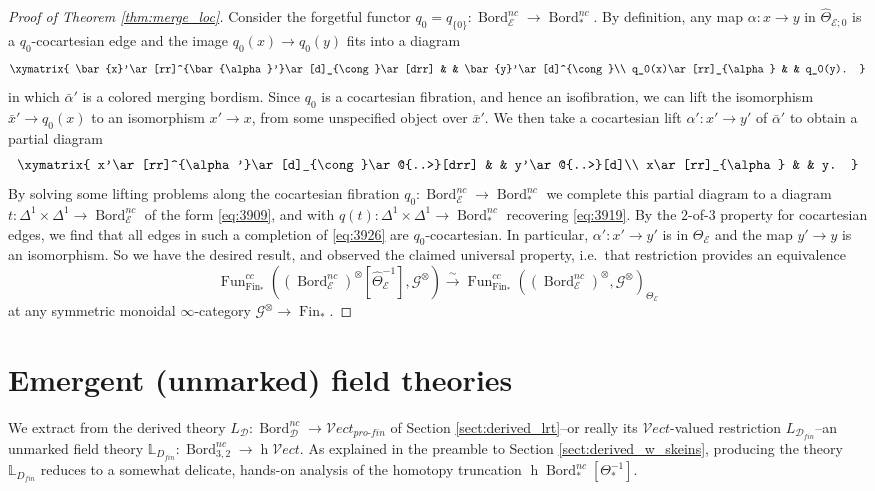\documentclass[reqno]{amsart}
\theoremstyle{definition}
\newcommand{\mbb}[1]{\mathbb{#1}}
\newcommand{\msc}[1]{\mathscr{#1}}
\newcommand{\opn}[1]{\operatorname{#1}}
\newcommand{\ot}{\otimes}
\newcommand{\Vect}{\msc{V}\!ect}
\newcommand{\pf}{pro\text{-}fin}
\DeclareMathOperator{\Fun}{Fun}
\DeclareMathOperator{\Fin}{Fin}
\DeclareMathOperator{\Bord}{Bord}
\renewcommand{\1}{\mathbf{1}}
\renewcommand{\hat}{\widehat}
\begin{document}
\begin{proof}[Proof of Theorem \ref{thm:merge_loc}]
Consider the forgetful functor $q_0=q_{\{0\}}:\Bord_{\msc{E}}^{nc}\to \Bord_{\ast}^{nc}$.  By definition, any map $\alpha:x\to y$ in $\hat{\Theta}_{\msc{E};0}$ is a $q_0$-cocartesian edge and the image $q_0(x)\to q_0(y)$ fits into a diagram
\begin{equation}\label{eq:3919}
\xymatrix{
\bar{x}'\ar[rr]^{\bar{\alpha}'}\ar[d]_{\cong}\ar[drr] & & \bar{y}'\ar[d]^{\cong}\\
q_0(x)\ar[rr]_{\alpha} & & q_0(y).
}
\end{equation}
in which $\bar{\alpha}'$ is a colored merging bordism.  Since $q_0$ is a cocartesian fibration, and hence an isofibration, we can lift the isomorphism $\bar{x}'\to q_0(x)$ to an isomorphism $x'\to x$, from some unspecified object over $\bar{x}'$.  We then take a cocartesian lift $\alpha':x'\to y'$ of $\bar{\alpha}'$ to obtain a partial diagram
\begin{equation}\label{eq:3926}
\xymatrix{
x'\ar[rr]^{\alpha'}\ar[d]_{\cong}\ar@{..>}[drr] & & y'\ar@{..>}[d]\\
x\ar[rr]_{\alpha} & & y.
}
\end{equation}
By solving some lifting problems along the cocartesian fibration $q_0:\Bord_{\msc{E}}^{nc}\to \Bord_{\ast}^{nc}$ we complete this partial diagram to a diagram $t:\Delta^1\times\Delta^1\to \Bord_{\msc{E}}^{nc}$ of the form \eqref{eq:3909}, and with $q(t):\Delta^1\times\Delta^1\to \Bord_{\ast}^{nc}$ recovering \eqref{eq:3919}.  By the $2$-of-$3$ property for cocartesian edges, we find that all edges in such a completion of \eqref{eq:3926} are $q_0$-cocartesian.  In particular, $\alpha':x'\to y'$ is in $\Theta_{\msc{E}}$ and the map $y'\to y$ is an isomorphism.  So we have the desired result, and observed the claimed universal property, i.e.\ that restriction provides an equivalence
\[
\Fun_{\Fin_{\ast}}^{cc}\left((\Bord_{\msc{E}}^{nc})^{\ot}[\hat{\Theta}_{\msc{E}}^{-1}],\msc{G}^{\ot}\right)\overset{\sim}\to \Fun_{\Fin_{\ast}}^{cc}\left((\Bord_{\msc{E}}^{nc})^{\ot},\msc{G}^{\ot}\right)_{\Theta_{\msc{E}}}
\]
at any symmetric monoidal $\infty$-category $\msc{G}^{\ot}\to \Fin_{\ast}$.
\end{proof}


\section{Emergent (unmarked) field theories}
\label{sect:unmarked_lrt}

We extract from the derived theory $L_{\msc{D}}:\Bord_{\msc{D}}^{nc}\to \Vect_{\pf}$ of Section \ref{sect:derived_lrt}--or really its $\Vect$-valued restriction $L_{\msc{D}_{fin}}$--an unmarked field theory $\mbb{L}_{D_{fin}}:\Bord_{3,2}^{nc}\to \opn{h}\Vect$. As explained in the preamble to Section \ref{sect:derived_w_skeins}, producing the theory $\mbb{L}_{D_{fin}}$ reduces to a somewhat delicate, hands-on analysis of the homotopy truncation $\opn{h}\Bord_{\ast}^{nc}[\Theta_{\ast}^{-1}]$.
\par
\end{document}
